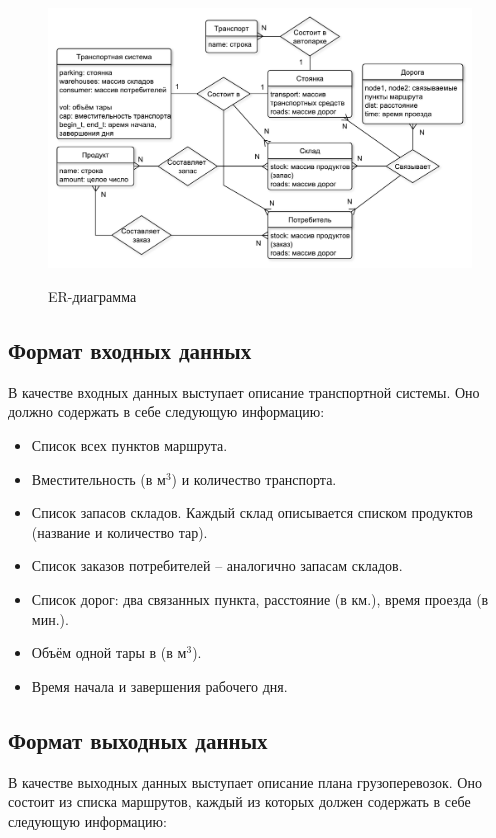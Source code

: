 \begin{figure}[h]
	\begin{center}
		{\includegraphics[scale=0.65, angle=0, page=1]{img/ER.pdf}}
		\caption{ER-диаграмма}
		\label{ER}
	\end{center}
\end{figure}

\pagebreak
\subsection{Формат входных данных}
В качестве входных данных выступает описание транспортной системы. Оно должно содержать в себе следующую информацию:

\begin{itemize}
	\item Список всех пунктов маршрута.
	\item Вместительность (в м$^3$) и количество транспорта.
	\item Список запасов складов. Каждый склад описывается списком продуктов (название и количество тар).
	\item Список заказов потребителей -- аналогично запасам складов.
	\item Список дорог: два связанных пункта, расстояние (в км.), время проезда (в мин.).
	\item Объём одной тары в (в м$^3$).
	\item Время начала и завершения рабочего дня.
\end{itemize}

\subsection{Формат выходных данных}
В качестве выходных данных выступает описание плана грузоперевозок. Оно состоит из списка маршрутов, каждый из которых должен содержать в себе следующую информацию:

